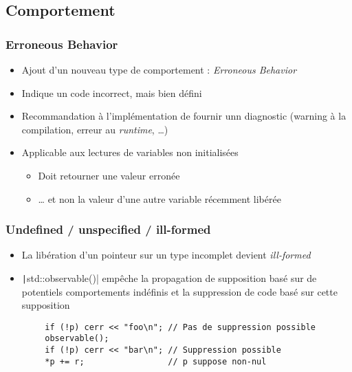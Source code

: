 \documentclass[C++.tex]{subfiles}
\begin{document}
\subsection*{Comportement}
\begin{frame}[fragile]
	\frametitle{Erroneous Behavior}
	\begin{itemize}
		\item Ajout d'un nouveau type de comportement : \textit{Erroneous Behavior}
		\item Indique un code incorrect, mais bien défini
		\item Recommandation à l'implémentation de fournir unn diagnostic (warning à la compilation, erreur au \textit{runtime}, \ldots{})
		\item Applicable aux lectures de variables non initialisées
		\begin{itemize}
			\item Doit retourner une valeur \og{}erronée\fg{}


			\item \ldots{} et non la valeur d'une autre variable récemment libérée
		\end{itemize}
	\end{itemize}

\end{frame}

\begin{frame}[fragile]
	\frametitle{Undefined / unspecified / ill-formed}
	\begin{itemize}
		\item La libération d'un pointeur sur un type incomplet devient \textit{ill-formed}


		\item \texttt|std::observable()| empêche la propagation de supposition basé sur de potentiels comportements indéfinis et la suppression de code basé sur cette supposition

	\end{itemize}

	\begin{verbatim}
		if (!p) cerr << "foo\n"; // Pas de suppression possible
		observable();
		if (!p) cerr << "bar\n"; // Suppression possible
		*p += r;                 // p suppose non-nul
	\end{verbatim}

\end{frame}
\end{document}
